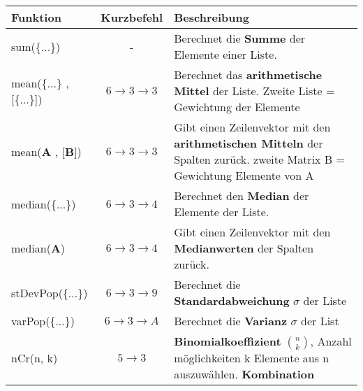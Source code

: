 \begin{tabular}{|p{5cm}|c|p{10cm}|}
    \hline
    \rowcolor{Gray}
    \textbf{Funktion}                & \textbf{Kurzbefehl}              & \textbf{Beschreibung}                                                                                                    \\
    \hline
    sum(\{...\})                     & -                                & Berechnet die \textbf{Summe} der Elemente einer Liste.                                                                   \\
    \hline
    mean(\{...\} , [\{...\}])        & $6 \rightarrow 3 \rightarrow 3$  & Berechnet das \textbf{arithmetische Mittel} der Liste.
    \newline Zweite Liste = Gewichtung der Elemente                                                                                                                                                \\
    \hline
    mean(\textbf{A} , [\textbf{B}])  & $6 \rightarrow 3 \rightarrow 3$  & Gibt einen Zeilenvektor mit den \textbf{arithmetischen Mitteln}
    \newline der Spalten zurück.
    \newline zweite Matrix B = Gewichtung Elemente von A                                                                                                                                           \\
    \hline
    median(\{...\})                  & $6 \rightarrow 3 \rightarrow 4$  & Berechnet den \textbf{Median} der Elemente der Liste.                                                                    \\
    \hline
    median(\textbf{A})               & $6 \rightarrow 3 \rightarrow 4$  & Gibt einen Zeilenvektor mit den \textbf{Medianwerten} der Spalten zurück.                                                \\
    \hline
    stDevPop(\{...\})                & $6 \rightarrow 3 \rightarrow 9 $ & Berechnet die \textbf{Standardabweichung} $\sigma$ der Liste                                                             \\
    \hline
    varPop(\{...\})                  & $6 \rightarrow 3 \rightarrow A$  & Berechnet die \textbf{Varianz} $\sigma$ der List                                                                         \\
    \hline
    nCr(n, k)                        & $5 \rightarrow 3$                & \textbf{Binomialkoeffizient} $\binom{n}{k}$, Anzahl möglichkeiten k Elemente aus n auszuwählen. \newline \textbf{Kombination}     \\

\end{tabular}
